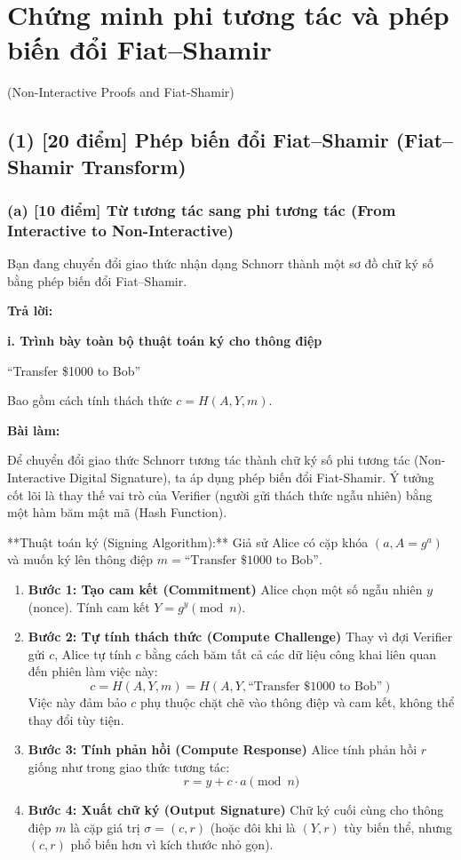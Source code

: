 \section{Chứng minh phi tương tác và phép biến đổi Fiat–Shamir}
(Non-Interactive Proofs and Fiat-Shamir)

\subsection{(1) [20 điểm] Phép biến đổi Fiat–Shamir (Fiat–Shamir Transform)}

\subsubsection{(a) [10 điểm] Từ tương tác sang phi tương tác (From Interactive to Non-Interactive)}

Bạn đang chuyển đổi giao thức nhận dạng Schnorr thành một sơ đồ chữ ký số bằng phép biến đổi Fiat–Shamir.

\begin{center}
    \textbf{Trả lời:}
\end{center}

\textbf{i. Trình bày toàn bộ thuật toán ký cho thông điệp}

``Transfer \$1000 to Bob''

Bao gồm cách tính thách thức $c = H(A, Y, m)$.

\textbf{Bài làm:}

Để chuyển đổi giao thức Schnorr tương tác thành chữ ký số phi tương tác (Non-Interactive Digital Signature), ta áp dụng phép biến đổi Fiat-Shamir. Ý tưởng cốt lõi là thay thế vai trò của Verifier (người gửi thách thức ngẫu nhiên) bằng một hàm băm mật mã (Hash Function).

**Thuật toán ký (Signing Algorithm):**
Giả sử Alice có cặp khóa $(a, A=g^a)$ và muốn ký lên thông điệp $m = \text{``Transfer \$1000 to Bob''}$.

\begin{enumerate}
    \item \textbf{Bước 1: Tạo cam kết (Commitment)}
    Alice chọn một số ngẫu nhiên $y$ (nonce).
    Tính cam kết $Y = g^y \pmod{n}$.
    
    \item \textbf{Bước 2: Tự tính thách thức (Compute Challenge)}
    Thay vì đợi Verifier gửi $c$, Alice tự tính $c$ bằng cách băm tất cả các dữ liệu công khai liên quan đến phiên làm việc này:
    \[
    c = H(A, Y, m) = H(A, Y, \text{``Transfer \$1000 to Bob''})
    \]
    Việc này đảm bảo $c$ phụ thuộc chặt chẽ vào thông điệp và cam kết, không thể thay đổi tùy tiện.
    
    \item \textbf{Bước 3: Tính phản hồi (Compute Response)}
    Alice tính phản hồi $r$ giống như trong giao thức tương tác:
    \[
    r = y + c \cdot a \pmod{n}
    \]
    
    \item \textbf{Bước 4: Xuất chữ ký (Output Signature)}
    Chữ ký cuối cùng cho thông điệp $m$ là cặp giá trị $\sigma = (c, r)$ (hoặc đôi khi là $(Y, r)$ tùy biến thể, nhưng $(c, r)$ phổ biến hơn vì kích thước nhỏ gọn).
\end{enumerate}

